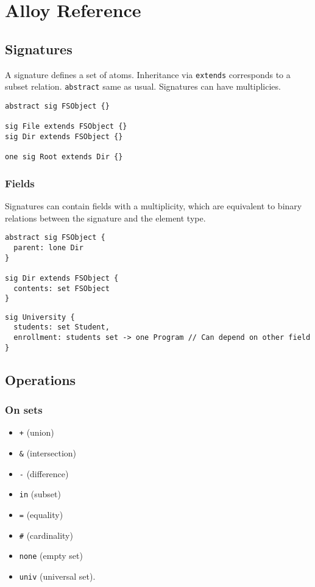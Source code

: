 \documentclass[11pt]{article}
\author{Silvan Mosberger}
\date{\today}
\title{}
\begin{document}
\tableofcontents

\section{Alloy Reference}
\label{sec:orgb06ff24}

\subsection{Signatures}
\label{sec:orgb025cb3}

A signature defines a set of atoms. Inheritance via \texttt{extends} corresponds to a subset relation. \texttt{abstract} same as usual. Signatures can have multiplicies.

\begin{verbatim}
abstract sig FSObject {}

sig File extends FSObject {}
sig Dir extends FSObject {}

one sig Root extends Dir {}
\end{verbatim}

\subsubsection{Fields}
\label{sec:org5626073}

Signatures can contain fields with a multiplicity, which are equivalent to binary relations between the signature and the element type.

\begin{verbatim}
abstract sig FSObject {
  parent: lone Dir
}

sig Dir extends FSObject {
  contents: set FSObject
}
\end{verbatim}

\begin{verbatim}
sig University {
  students: set Student,
  enrollment: students set -> one Program // Can depend on other field
}
\end{verbatim}
\subsection{Operations}
\label{sec:org234f1cc}

\subsubsection{On sets}
\label{sec:orgd7047cd}

\begin{itemize}
\item \texttt{+} (union)
\item \texttt{\&} (intersection)
\item \texttt{-} (difference)
\item \texttt{in} (subset)
\item \texttt{=} (equality)
\item \texttt{\#} (cardinality)
\item \texttt{none} (empty set)
\item \texttt{univ} (universal set).
\end{itemize}
\end{document}
